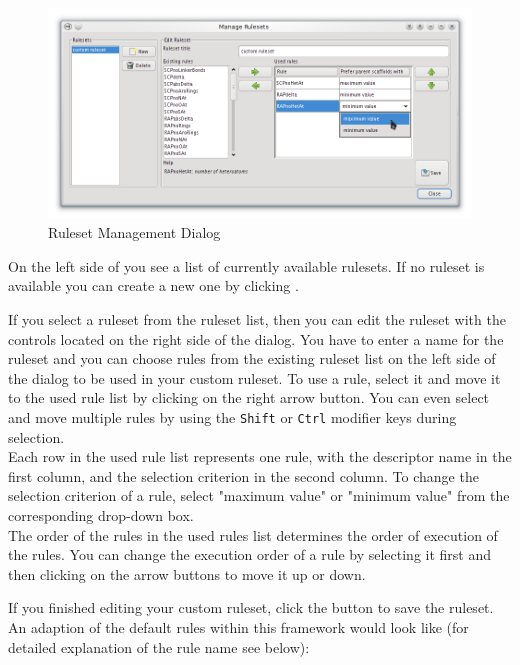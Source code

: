 \begin{figure}[ht]
   \centering
   \includegraphics[width=\textwidth]{images/sh_manage_rulesets_dialog.png}
   \caption{Ruleset Management Dialog}
   \label{fig:ruleset_management}
\end{figure}

On the left side of  you see a list of currently available rulesets.
If no ruleset is available you can create a new one by clicking .

If you select a ruleset from the ruleset list, then you can edit the ruleset with the controls located on the right side of the dialog.
You have to enter a name for the ruleset and you can choose rules from the existing ruleset list on the left side of the dialog to be used in your custom ruleset.
To use a rule, select it and move it to the used rule list by clicking on the right arrow button.
You can even select and move multiple rules by using the \texttt{Shift} or \texttt{Ctrl} modifier keys during selection.\\

Each row in the used rule list represents one rule, with the descriptor name in the first column, and the selection criterion in the second column.
To change the selection criterion of a rule, select "maximum value" or "minimum value" from the corresponding drop-down box.\\

The order of the rules in the used rules list determines the order of execution of the rules.
You can change the execution order of a rule by selecting it first and then clicking on the arrow buttons to move it up or down.

If you finished editing your custom ruleset, click the  button to save the ruleset.\\

An adaption of the default rules within this framework would look like (for detailed explanation of the rule name see below):

